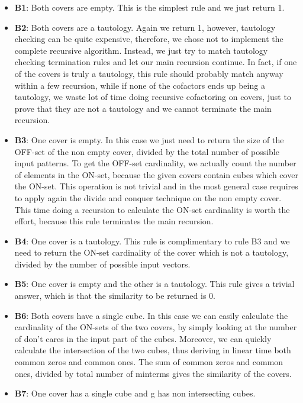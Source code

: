 \documentclass{acm_proc_article-sp}
\begin{document}
\begin{itemize}
  \item {\bf B1}: Both covers are empty. This is the simplest rule and we just
    return 1.
  \item {\bf B2}: Both covers are a tautology. Again we return 1, however,
    tautology checking can be quite expensive, therefore, we chose not to
    implement the complete recursive algorithm. Instead, we just try to match
    tautology checking termination rules and let our main recursion continue.
    In fact, if one of the covers is truly a tautology, this rule should probably
    match anyway within a few recursion, while if none of the cofactors ends
    up being a tautology, we waste lot of time doing recursive cofactoring on
    covers, just to prove that they are not a tautology and we cannot terminate
    the main recursion.
  \item {\bf B3}: One cover is empty. In this case we just need to return the
    size of the OFF-set of the non empty cover, divided by the total number of
    possible input patterns. To get the OFF-set cardinality, we actually count
    the number of elements in the ON-set, because the given covers contain cubes
    which cover the ON-set. This operation is not trivial and in the most general
    case requires to apply again the divide and conquer technique on the non
    empty cover. This time doing a recursion to calculate the ON-set cardinality
    is worth the effort, because this rule terminates the main recursion.
  \item {\bf B4}: One cover is a tautology. This rule is complimentary to rule B3
    and we need to return the ON-set cardinality of the cover which is not a
    tautology, divided by the number of possible input vectors.
  \item {\bf B5}: One cover is empty and the other is a tautology. This rule gives
    a trivial answer, which is that the similarity to be returned is 0.
  \item {\bf B6}: Both covers have a single cube. In this case we can easily
    calculate the cardinality of the ON-sets of the two covers, by simply
    looking at the number of don't cares in the input part of the cubes.
    Moreover, we can quickly calculate the intersection of the two cubes, thus
    deriving in linear time both common zeros and common ones. The sum of common
    zeros and common ones, divided by total number of minterms gives the similarity
    of the covers.
  \item {\bf B7}: One cover has a single cube and g has non intersecting cubes.

\end{itemize}
\end{document}
